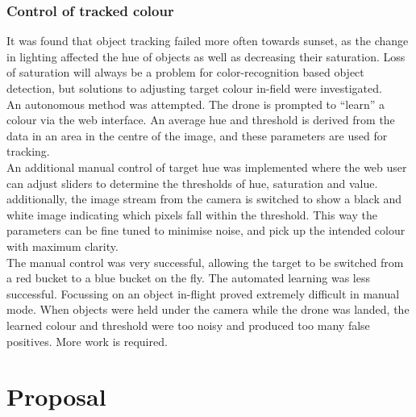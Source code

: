 \documentclass[a4paper, 12pt, titlepage]{article}
\begin{document}
	\subsubsection{Control of tracked colour}
It was found that object tracking failed more often towards sunset, as the change in lighting affected the hue of objects as well as decreasing their saturation. Loss of saturation will always be a problem for color-recognition based object detection, but solutions to adjusting target colour in-field were investigated. 
\\An autonomous method was attempted. The drone is prompted to “learn” a colour via the web interface. An average hue and threshold is derived from the data in an area in the centre of the image, and these parameters are used for tracking. 
\\An additional manual control of target hue was implemented where the web user can adjust sliders to determine the thresholds of hue, saturation and value. additionally, the image stream from the camera is switched to show a black and white image indicating which pixels fall within the threshold. This way the parameters can be fine tuned to minimise noise, and pick up the intended colour with maximum clarity.
\\The manual control was very successful, allowing the target to be switched from a red bucket to a blue bucket on the fly.
The automated learning was less successful. Focussing on an object in-flight proved extremely difficult in manual mode. When objects were held under the camera while the drone was landed, the learned colour and threshold were too noisy and produced too many false positives. More work is required.




\section{Proposal}
\end{document}
